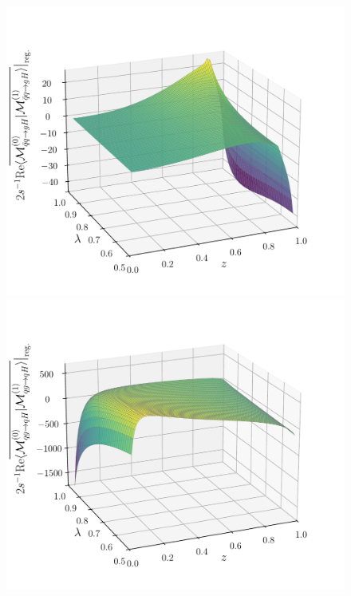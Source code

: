 \begin{figure}[h]
\begin{minipage}[t]{0.49\textwidth}
  \includegraphics[width=\textwidth]{Images/RV_amplitudes/tOSbOS_qBq.pdf}
  \end{minipage}
  \begin{minipage}[t]{0.49\textwidth}
  \centering
  \includegraphics[width=\textwidth]{Images/RV_amplitudes/tOSbOS_qg.pdf}
  \end{minipage}
  \begin{minipage}[t]{0.49\textwidth}

\end{minipage}
\end{figure}
